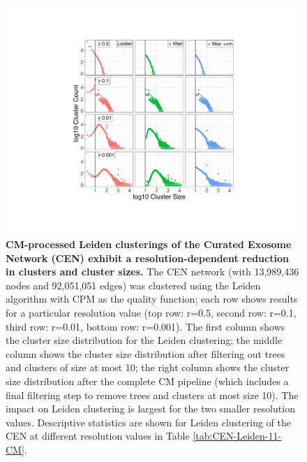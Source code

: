 \documentclass[11pt]{article}   	%
\begin{document}
\begin{figure}[H]
\centering
\includegraphics[width=0.8\linewidth]{figs/fig2_kn.pdf}
\caption{\textbf{CM-processed Leiden clusterings of the Curated Exosome Network (CEN) exhibit a resolution-dependent reduction in clusters and cluster sizes.}
The CEN network (with 13,989,436 nodes and 92,051,051 edges) was clustered using the Leiden algorithm with CPM as the quality function; each row shows results for a particular resolution value (top row: r=0.5, second row: r=0.1, third row: r=0.01, bottom row: r=0.001).
The first column shows the cluster size distribution for the Leiden clustering; the middle column shows the cluster size distribution after filtering out trees and clusters of size at most 10; the right column shows the cluster size distribution after the complete CM pipeline (which includes a final filtering step to remove trees and clusters at most size 10).
The impact on Leiden clustering is largest for the two smaller resolution values. Descriptive statistics are shown for Leiden clustering of the CEN at different resolution values in Table \ref{tab:CEN-Leiden-11-CM}.}
\label{fig:CEN_size_count_plots_leiden}
\end{figure}
\end{document}
